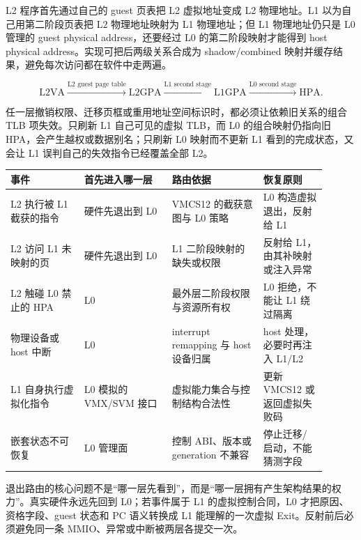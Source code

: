 
L2 程序首先通过自己的 guest 页表把 L2 虚拟地址变成 L2 物理地址。L1 以为自己用第二阶段页表把 L2 物理地址映射为 L1 物理地址；但 L1 物理地址仍只是 L0 管理的 guest physical address，还要经过 L0 的第二阶段映射才能得到 host physical address。实现可把后两级关系合成为 shadow/combined 映射并缓存结果，避免每次访问都在软件中走两遍。

\[
\mathrm{L2VA}\xrightarrow{\text{L2 guest page table}}\mathrm{L2GPA}
\xrightarrow{\text{L1 second stage}}\mathrm{L1GPA}
\xrightarrow{\text{L0 second stage}}\mathrm{HPA}.
\]

任一层撤销权限、迁移页框或重用地址空间标识时，都必须让依赖旧关系的组合 TLB 项失效。只刷新 L1 自己可见的虚拟 TLB，而 L0 的组合映射仍指向旧 HPA，会产生越权或数据别名；只刷新 L0 映射而不更新 L1 看到的完成状态，又会让 L1 误判自己的失效指令已经覆盖全部 L2。

\begin{longtable}{L{0.21\linewidth}L{0.25\linewidth}L{0.26\linewidth}L{0.18\linewidth}}
\toprule
事件 & 首先进入哪一层 & 路由依据 & 恢复原则 \\
\midrule
L2 执行被 L1 截获的指令 & 硬件先退出到 L0 & VMCS12 的截获意图与 L0 策略 & L0 构造虚拟退出，反射给 L1 \\\tablerowrule
L2 访问 L1 未映射的页 & 硬件先退出到 L0 & L1 二阶段映射的缺失或权限 & 反射给 L1，由其补映射或注入异常 \\\tablerowrule
L2 触碰 L0 禁止的 HPA & L0 & 最外层二阶段权限与资源所有权 & L0 拒绝，不能让 L1 绕过隔离 \\\tablerowrule
物理设备或 host 中断 & L0 & interrupt remapping 与 host 设备归属 & host 处理，必要时再注入 L1/L2 \\\tablerowrule
L1 自身执行虚拟化指令 & L0 模拟的 VMX/SVM 接口 & 虚拟能力集合与控制结构合法性 & 更新 VMCS12 或返回虚拟失败码 \\\tablerowrule
嵌套状态不可恢复 & L0 管理面 & 控制 ABI、版本或 generation 不兼容 & 停止迁移/启动，不能猜测字段 \\
\bottomrule
\end{longtable}

退出路由的核心问题不是“哪一层先看到”，而是“哪一层拥有产生架构结果的权力”。真实硬件永远先回到 L0；若事件属于 L1 的虚拟控制合同，L0 才把原因、资格字段、guest 状态和 PC 语义转换成 L1 能理解的一次虚拟 Exit。反射前后必须避免同一条 MMIO、异常或中断被两层各提交一次。


